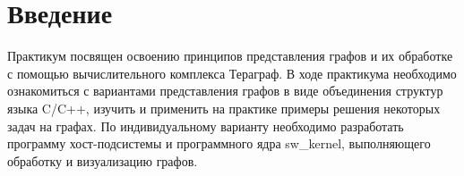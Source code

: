 \chapter*{Введение}

Практикум посвящен освоению принципов представления графов и их обработке
с помощью вычислительного комплекса Тераграф. В ходе практикума
необходимо ознакомиться с вариантами представления графов в виде
объединения структур языка C/C++, изучить и применить на практике примеры
решения некоторых задач на графах. По индивидуальному варианту необходимо
разработать программу хост-подсистемы и программного ядра sw\_kernel,
выполняющего обработку и визуализацию графов.

